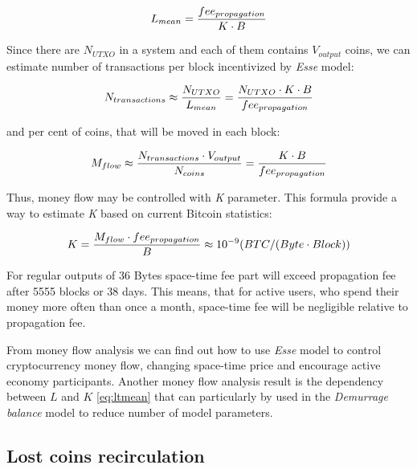 \documentclass[]{article}   %
\newcommand{\esse}{\textit{Esse}}
\begin{document}
\begin{equation}
\label{eq:ltmean}
L_{mean}={fee_{propagation} \over K \cdot B}
\end{equation}

Since there are $N_{UTXO}$ in a system and each of them contains $V_{output}$ coins, we can estimate number of transactions per block incentivized by \esse{} model:

\begin{equation}
N_{transactions} \approx {N_{UTXO} \over L_{mean}} = {N_{UTXO} \cdot K \cdot B \over fee_{propagation}}
\end{equation}

and per cent of coins, that will be moved in each block:

\begin{equation}
M_{flow} \approx { N_{transactions} \cdot V_{output} \over N_{coins}} = {K \cdot B \over fee_{propagation}}
\end{equation}

Thus, money flow may be controlled with \textit{K} parameter. This formula provide a way to estimate \textit{K} based on current Bitcoin statistics:

\begin{equation}
K={M_{flow} \cdot fee_{propagation} \over B} \approx {10^{-9}} ({BTC / (Byte \cdot Block)})
\end{equation}

For regular outputs of 36 Bytes space-time fee part will exceed propagation fee after 5555 blocks or 38 days. This means, that for active users, who spend their money more often than once a month, space-time fee will be negligible relative to propagation fee.

From money flow analysis we can find out how to use \esse{} model to control cryptocurrency money flow, changing space-time price and encourage active economy participants. Another money flow analysis result is the dependency between $L$ and $K$ \ref{eq:ltmean} that can particularly by used in the \textit{Demurrage balance} model to reduce number of model parameters.


\subsection{Lost coins recirculation}
\label{sec:re}
\end{document}
